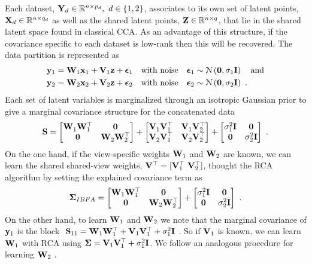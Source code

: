       Each dataset, $\mathbf{Y}_d \in \mathbb{R}^{n \times p_d}, ~d \in \{1,2\}$, associates to its own set of latent points, $\mathbf{X}_d \in \mathbb{R}^{n \times q_d}$ as well as the shared latent points, $\mathbf{Z} \in \mathbb{R}^{n \times q}$, that lie in the shared latent space found in classical CCA.
      As an advantage of this structure, if the covariance specific to each dataset is low-rank then this will be recovered.
      The data partition is represented as
      \begin{align*}
        \begin{split}
        & \mathbf{y}_1 = \mathbf{W}_1 \mathbf{x}_1 + \mathbf{V}_1 \mathbf{z} + \boldsymbol{\epsilon}_1 \quad \textrm{with noise} \quad \boldsymbol{\epsilon}_1 \sim \mathcal{N} \left(  \mathbf{0} ,  \sigma_1 \mathbf{I}  \right) \quad \textrm{and} \\
        & \mathbf{y}_2 = \mathbf{W}_2 \mathbf{x}_2 + \mathbf{V}_2 \mathbf{z} + \boldsymbol{\epsilon}_2 \quad \textrm{with noise} \quad \boldsymbol{\epsilon}_2 \sim \mathcal{N} \left(  \mathbf{0} ,  \sigma_2 \mathbf{I}  \right) ~.
        \end{split}
      \end{align*}
      Each set of latent variables is marginalized through an isotropic Gaussian prior to give a marginal covariance structure for the concatenated data
      \[
        \mathbf{S} = \begin{bmatrix}  \mathbf{W}_1^{}\mathbf{W}_1^\top & \mathbf{0} \\ \mathbf{0} & \mathbf{W}_2^{} \mathbf{W}_2^\top  \end{bmatrix}
        + \begin{bmatrix}  \mathbf{V}_1^{}\mathbf{V}_1^\top & \mathbf{V}_1^{}\mathbf{V}_2^\top \\ \mathbf{V}_2^{}\mathbf{V}_1^\top & \mathbf{V}_2^{} \mathbf{V}_2^\top  \end{bmatrix}
        + \begin{bmatrix}  \sigma^2_1 \mathbf{I} & \mathbf{0} \\ \mathbf{0} & \sigma^2_2 \mathbf{I}  \end{bmatrix} ~.
      \]
      On the one hand, if the view-specific weights $\mathbf{W}_1$ and $\mathbf{W}_2$ are known, we can learn the shared shared-view weights, $\mathbf{V}^\top = [ \mathbf{V}_1^\top ~ \mathbf{V}_2^\top ]$, thought the RCA algorithm by setting the explained covariance term as
      \[
        \mathbf{\Sigma}_{IBFA} = \begin{bmatrix}  \mathbf{W}_1\mathbf{W}_1^\top & \mathbf{0}\\ \mathbf{0} & \mathbf{W}_2{} \mathbf{W}_2^\top  \end{bmatrix}
        + \begin{bmatrix}  \sigma^2_1 \mathbf{I} & \mathbf{0} \\ \mathbf{0} & \sigma^2_2 \mathbf{I}  \end{bmatrix} ~.
      \]
      On the other hand, to learn $\mathbf{W}_1$ and $\mathbf{W}_2$ we note that the marginal covariance of $\mathbf{y}_1$ is the block $~\mathbf{S}_{11} = \mathbf{W}_1 \mathbf{W}_1^\top + \mathbf{V}_1 \mathbf{V}_1^\top + \sigma^2_1 \mathbf{I}~$.
      So if $\mathbf{V}_1$ is known, we can learn $\mathbf{W}_1$ with RCA using $\mathbf{\Sigma} = \mathbf{V}_1 \mathbf{V}_1^\top + \sigma^2_1 \mathbf{I}$.
      We follow an analogous procedure for learning $\mathbf{W}_2~$.
      
